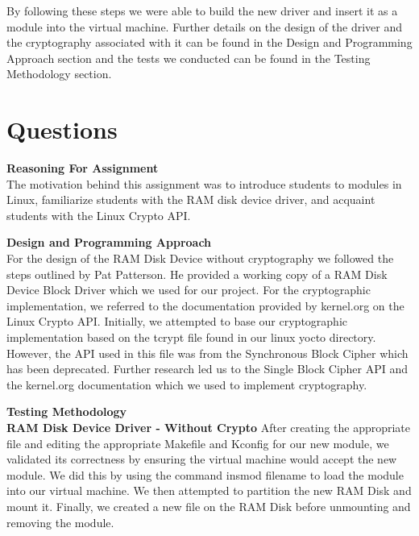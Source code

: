 \documentclass[letterpaper,10pt,draftclsnofoot,titlepage,onecolumn]{IEEEtran}
\begin{document}
By following these steps we were able to build the new driver and insert it as a module into the virtual machine. 
Further details on the design of the driver and the cryptography associated with it can be found in the Design and Programming Approach section and the tests we conducted can be found in the Testing Methodology section. \\


	\clearpage
	\section{Questions}
	
	\textbf{Reasoning For Assignment}\\
The motivation behind this assignment was to introduce students to modules in Linux, familiarize students with the RAM disk device driver, and acquaint students with the Linux Crypto API. 	
		
	\textbf{Design and Programming Approach}\\
For the design of the RAM Disk Device without cryptography we followed the steps outlined by Pat Patterson. 
He provided a working copy of a RAM Disk Device Block Driver which we used for our project. 
For the cryptographic implementation, we referred to the documentation provided by kernel.org on the Linux Crypto API. 
Initially, we attempted to base our cryptographic implementation based on the tcrypt file found in our linux yocto directory. 
However, the API used in this file was from the Synchronous Block Cipher which has been deprecated. 
Further research led us to the Single Block Cipher API and the kernel.org documentation which we used to implement cryptography.

	\textbf{Testing Methodology}\\
		\textbf{RAM Disk Device Driver - Without Crypto}
 		After creating the appropriate file and editing the appropriate Makefile and Kconfig for our new module, we validated its correctness by ensuring the virtual machine would accept the new module. 
 		We did this by using the command insmod filename to load the module into our virtual machine. 
 		We then attempted to partition the new RAM Disk and mount it. 
 		Finally, we created a new file on the RAM Disk before unmounting and removing the module.
 		
\end{document}

